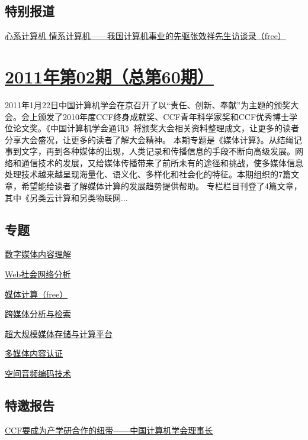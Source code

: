 \documentclass[a4paper]{article}
\begin{document}
\subsection{特别报道}
\href{http://history.ccf.org.cn/resources/1190201776262/2011/03/22/1.pdf}{心系计算机 情系计算机——我国计算机事业的先驱张效祥先生访谈录（free）}


\section{\href{http://history.ccf.org.cn/sites/ccf/jsjtbbd.jsp?contentId=2590507189137}{\textbf{2011年第02期（总第60期）}}}
2011年1月22日中国计算机学会在京召开了以“责任、创新、奉献”为主题的颁奖大会。会上颁发了2010年度CCF终身成就奖、CCF青年科学家奖和CCF优秀博士学位论文奖。《中国计算机学会通讯》将颁奖大会相关资料整理成文，让更多的读者分享大会盛况，让更多的读者了解大会精神。
本期专题是《媒体计算》。从结绳记事到文字，再到各种媒体的出现，人类记录和传播信息的手段不断向高级发展。网络和通信技术的发展，又给媒体传播带来了前所未有的途径和挑战，使多媒体信息处理技术越来越呈现海量化、语义化、多样化和社会化的特征。本期组织的7篇文章，希望能给读者了解媒体计算的发展趋势提供帮助。
专栏栏目刊登了4篇文章，其中《另类云计算和另类物联网...
\subsection{专题}
\href{http://history.ccf.org.cn/resources/1190201776262/2011/02/16/8.pdf}{数字媒体内容理解}

\href{http://history.ccf.org.cn/resources/1190201776262/2011/02/16/13.pdf}{Web社会网络分析}

\href{http://history.ccf.org.cn/resources/1190201776262/2011/02/16/7.pdf}{媒体计算（free）}

\href{http://history.ccf.org.cn/resources/1190201776262/2011/02/16/9.pdf}{跨媒体分析与检索}

\href{http://history.ccf.org.cn/resources/1190201776262/2011/02/16/10.pdf}{超大规模媒体存储与计算平台}

\href{http://history.ccf.org.cn/resources/1190201776262/2011/02/16/11.pdf}{多媒体内容认证}

\href{http://history.ccf.org.cn/resources/1190201776262/2011/02/16/12.pdf}{空间音频编码技术}

\subsection{特邀报告}
\href{http://history.ccf.org.cn/resources/1190201776262/2011/02/16/2.pdf}{CCF要成为产学研合作的纽带——中国计算机学会理事长}
\end{document}
